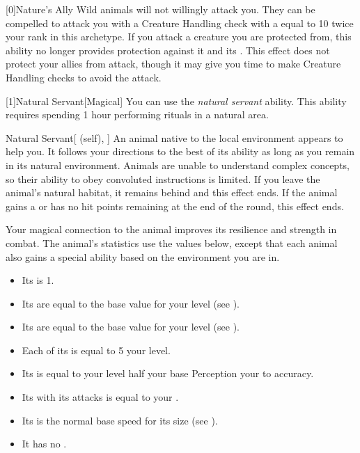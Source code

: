         [0]{Nature's Ally} Wild animals will not willingly attack you.
        They can be compelled to attack you with a Creature Handling check with a  equal to 10 \add twice your rank in this archetype.
        If you attack a creature you are protected from, this ability no longer provides protection against it and its .
        This effect does not protect your allies from attack, though it may give you time to make Creature Handling checks to avoid the attack.

        [1]{Natural Servant}[Magical]
        You can use the \textit{natural servant} ability.
        This ability requires spending 1 hour performing rituals in a natural area.
        \begin{attuneability}{Natural Servant}[ (self), ]
            An animal native to the local environment appears to help you.
            It follows your directions to the best of its ability as long as you remain in its natural environment.
            Animals are unable to understand complex concepts, so their ability to obey convoluted instructions is limited.
            If you leave the animal's natural habitat, it remains behind and this effect ends.
            If the animal gains a  or has no hit points remaining at the end of the round, this effect ends.

            Your magical connection to the animal improves its resilience and strength in combat.
            The animal's statistics use the values below, except that each animal also gains a special ability based on the environment you are in.
            \begin{itemize}
                \item Its  is 1.
                \item Its  are equal to the base value for your level (see ).
                \item Its  are equal to the base value for your level (see ).
                \item Each of its  is equal to 5 \add your level.
                \item Its  is equal to your level \add half your base Perception \add your  to accuracy.
                \item Its  with its attacks is equal to your  .
                \item Its  is the normal base speed for its size (see ).
                \item It has no .
            \end{itemize}
        \end{attuneability}

